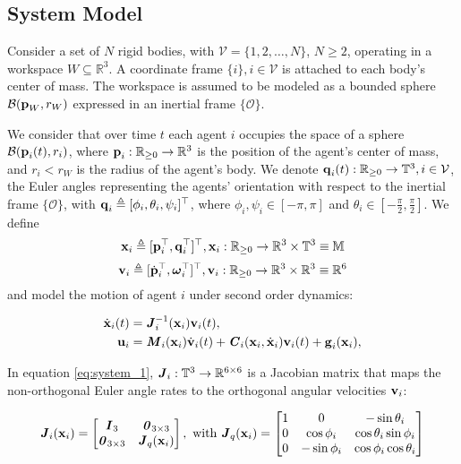 \subsection{System Model}

Consider a set of $N$ rigid bodies, with $\mathcal{V} = \{ 1,2, \ldots, N\}$,
$N  \geq 2$, operating in a workspace $W\subseteq \mathbb{R}^3$.
A coordinate frame $\{i\}, i\in\mathcal{V}$ is attached to each body's
center of mass. The workspace is assumed to be modeled as a
bounded sphere $\mathcal{B}(\bm{\mathbf{p}}_W,r_W)$ expressed in an inertial frame
$\{\mathcal{O}\}$.

We consider that over time $t$ each agent $i$ occupies the space of a sphere
$\mathcal{B}(\bm{\mathbf{p}}_i(t), r_i)$, where $\bm{\mathbf{p}}_i : \mathbb{R}_{\geq 0} \to \mathbb{R}^3$
is the position of the agent's center of mass, and $r_i < r_W$ is the radius of the
agent's body. We denote $\bm{\mathbf{q}}_i(t):\mathbb{R}_{\geq 0} \to \mathbb{T}^3, i\in\mathcal{V}$,
the Euler angles representing the agents' orientation with respect to the
inertial frame $\{\mathcal{O}\}$,
with $\bm{\mathbf{q}}_i \triangleq [\phi_i,\theta_i,\psi_i]^{\top}$, where
$\phi_i, \psi_i \in [-\pi, \pi]$ and
$\theta_i \in [-\frac{\pi}{2}, \frac{\pi}{2}]$. We define
$$\bm{\mathbf{x}}_i \triangleq [\bm{\mathbf{p}}^{\top}_i,\bm{\mathbf{q}}^{\top}_i]^{\top},
\bm{\mathbf{x}}_i:\mathbb{R}_{\geq 0} \to \mathbb{R}^3\times \mathbb{T}^3 \equiv \mathbb{M}$$
$$\bm{\mathbf{v}}_i \triangleq [\dot{\bm{\mathbf{p}}}^{\top}_i, \bm{\mathbf{\omega}}^{\top}_i]^{\top},
\bm{\mathbf{v}}_i : \mathbb{R}_{\geq 0} \to \mathbb{R}^3\times \mathbb{R}^3 \equiv \mathbb{R}^6$$
and model the motion of agent $i$ under second order dynamics:

\begin{subequations}
	\begin{align}
    \dot{\bm{\mathbf{x}}}_i(t) &= \bm{\mathit{J}}_i^{-1}(\bm{\mathbf{x}}_i) \bm{\mathbf{v}}_i(t), \label{eq:system_1} \\
    \bm{\mathbf{u}}_i &= \bm{\mathit{M}}_i(\bm{\mathbf{x}}_i) \dot{\bm{\mathbf{v}}}_i(t) + \bm{\mathit{C}}_i(\bm{\mathbf{x}}_i,\dot{\bm{\mathbf{x}}}_i) \bm{\mathbf{v}}_i(t)+\bm{\mathbf{g}}_i(\bm{\mathbf{x}}_i), \label{eq:system_2}
	\end{align}
  \label{eq:system}
\end{subequations}

In equation \eqref{eq:system_1}, $\bm{\mathit{J}}_i:\mathbb{T}^3 \to \mathbb{R}^{6\times6}$ is
a Jacobian matrix that maps the non-orthogonal Euler angle rates to the
orthogonal angular velocities $\bm{\mathbf{v}}_i$:

\begin{equation}
  \bm{\mathit{J}}_i(\bm{\mathbf{x}}_i) =
  \begin{bmatrix}
    \bm{\mathit{I}}_3 & \bm{\mathit{0}}_{3 \times 3} \\
    \bm{\mathit{0}}_{3 \times 3} & \bm{\mathit{J}}_{ q }(\bm{\mathbf{x}}_i) \\
  \end{bmatrix} \notag, \text{ with }
  \bm{\mathit{J}}_q(\bm{\mathbf{x}}_i) =
  \begin{bmatrix}
    1 & 0 & -\sin\theta_i \\
    0 & \cos\phi_i & \cos\theta_i \sin\phi_i \\
    0 & - \sin\phi_i & \cos\phi_i \cos\theta_i
  \end{bmatrix} \notag
\end{equation}


